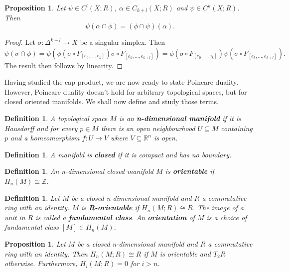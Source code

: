 \documentclass{article}
\newtheorem{definition}[theorem]{Definition}
\newtheorem{proposition}[theorem]{Proposition}
\begin{document}
\begin{proposition}
Let $\psi\in C^l(X;R)$, $\alpha\in C_{k+l}(X;R)$ and $\psi\in C^k(X;R)$. Then \[\psi(\alpha\cap\phi)=(\phi\cap\psi)(\alpha).\]
\end{proposition}
\begin{proof}
Let $\sigma\colon\Delta^{k+l}\to X$ be a singular simplex. Then \[\psi(\sigma\cap\phi)=\psi(\phi(\sigma\circ F_{[e_0,...,e_k]})\sigma\circ F_{[e_k,...,e_{k+l}]})=\phi(\sigma\circ F_{[e_0,...,e_k]})\psi(\sigma\circ F_{[e_k,...,e_{k+l}]}).\]
The result then follows by linearity.
\end{proof}

Having studied the cap product, we are now ready to state Poincare duality. However, Poincare duality doesn't hold for arbitrary topological spaces, but for closed oriented manifolds. We shall now define and study those terms.

\begin{definition}
A topological space $M$ is an \textbf{n-dimensional manifold} if it is Hausdorff and for every $p\in M$ there is an open neighbourhood $U\subseteq M$ containing $p$ and a homeomorphism $f\colon U\to V$ where $V\subseteq\mathbb{R}^n$ is open.
\end{definition}

\begin{definition}
A manifold is \textbf{closed} if it is compact and has no boundary.
\end{definition}

\begin{definition}
An n-dimensional closed manifold $M$ is \textbf{orientable} if $H_n(M)\cong \mathbb{Z}$.
\end{definition}

\begin{definition}
Let $M$ be a closed n-dimensional manifold and $R$ a commutative ring with an identity. $M$ is \textbf{R-orientable} if $H_n(M;R)\cong R$. The image of a unit in $R$ is called a \textbf{fundamental class}. An \textbf{orientation} of $M$ is a choice of fundamental class $[M]\in H_n(M)$.
\end{definition}

\begin{proposition}
Let $M$ be a closed n-dimensional manifold and $R$ a commutative ring with an identity. Then $H_n(M;R)\cong R$ if $M$ is orientable and $T_2R$ otherwise. Furthermore, $H_i(M;R)=0$ for $i>n$.
\end{proposition}
\end{document}
